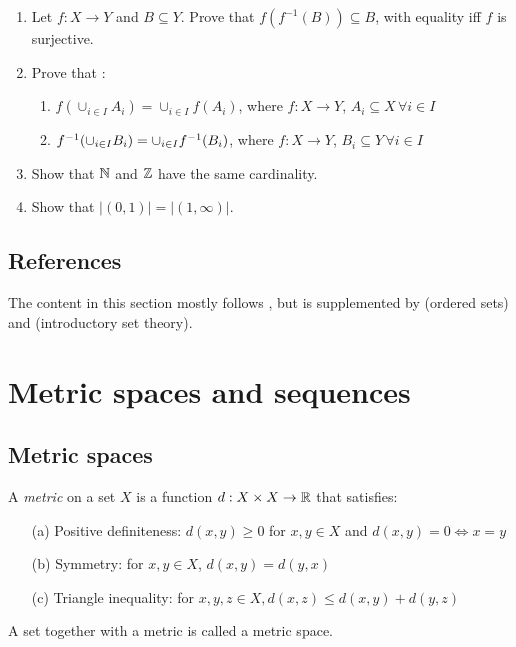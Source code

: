 \documentclass{article}
\begin{document}
\begin{enumerate}
    \item Let $f: X \to Y$ and $B \subseteq Y$. Prove that $f(f^{-1}(B)) \subseteq B$, with equality iff $f$ is surjective.
    \item Prove that :
    \begin{enumerate}
        \item $f(\cup_{i \in I}A_i) = \cup_{i \in I}f(A_i)$, where $f:X \to Y$, $A_i \subseteq X \, \forall i \in I$
        \item $f^{-1}(\cup_{i \in I}B_i) = \cup_{i \in I}f^{-1}(B_i)$, where $f:X \to Y$, $B_i \subseteq Y \, \forall i \in I$
    \end{enumerate}
    \item Show that ${\mathbb{N}}$ and ${\mathbb{Z}}$ have the same cardinality.
    \item Show that $|(0,1)| =|(1,\infty)|$.
\end{enumerate}


\subsection{References}
The content in this section mostly follows \cite{tastetopology}, but is supplemented by \cite{marcoux2019} (ordered sets) and \cite{piotr} (introductory set theory).

\section{Metric spaces and sequences}

\subsection{Metric spaces}
\begin{definition}
A \emph{metric} on a set $X$ is a function $d:X \times X \to {\mathbb{R}}$ that satisfies:
\begin{enumerate}
    \item[(a)] Positive definiteness: $d(x,y) \geq 0$ for $x,y \in X$ and $d(x,y) = 0 \Leftrightarrow x = y$
    \item[(b)] Symmetry: for $x,y \in X$, $d(x,y)= d(y,x)$
    \item[(c)] Triangle inequality: for $x,y,z \in X, d(x,z) \leq d(x,y) + d(y,z)$
\end{enumerate}
A set together with a metric is called a metric space.
\end{definition}
\end{document}
